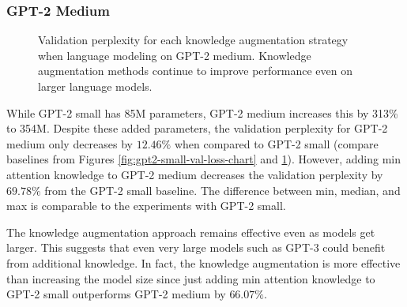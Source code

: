 \documentclass[phd,electronic,oneside,twosidetoc,letterpaper,chaptercenter,parttop,lof]{byumsphd}
\begin{document}
\subsubsection{GPT-2 Medium}

\begin{figure}
\centering
{}  
    \caption[GPT-2 medium validation loss chart]{
        Validation perplexity for each knowledge augmentation strategy when language modeling on GPT-2 medium.
        Knowledge augmentation methods continue to improve performance even on larger language models.
    }
    \label{fig:gpt2-med-val-loss-chart}
\end{figure}

While GPT-2 small has 85M parameters, GPT-2 medium increases this by 313\% to 354M. 
Despite these added parameters, the validation perplexity for GPT-2 medium only decreases by $12.46\%$ when compared to GPT-2 small (compare baselines from Figures \ref{fig:gpt2-small-val-loss-chart} and \ref{fig:gpt2-med-val-loss-chart}).
However, adding min attention knowledge to GPT-2 medium decreases the validation perplexity by $69.78\%$ from the GPT-2 small baseline.
The difference between min, median, and max is comparable to the experiments with GPT-2 small.

The knowledge augmentation approach remains effective even as models get larger.
This suggests that even very large models such as GPT-3 \cite{brown2020language} could benefit from additional knowledge.
In fact, the knowledge augmentation is more effective than increasing the model size since just adding min attention knowledge to GPT-2 small outperforms GPT-2 medium by $66.07\%$.
\end{document}
